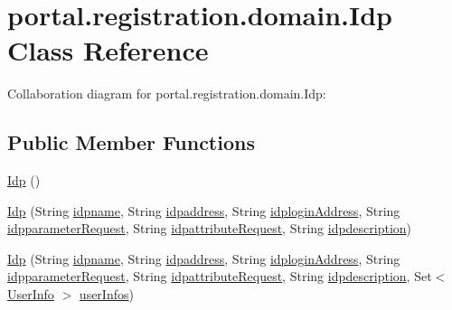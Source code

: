 \hypertarget{classportal_1_1registration_1_1domain_1_1Idp}{
\section{portal.registration.domain.Idp Class Reference}
\label{classportal_1_1registration_1_1domain_1_1Idp}
}


Collaboration diagram for portal.registration.domain.Idp:
\subsection*{Public Member Functions}
\begin{DoxyCompactItemize}
\item 
\hyperlink{classportal_1_1registration_1_1domain_1_1Idp_a89d6a58205cda942a28e7bce398c9c56}{Idp} ()
\item 
\hyperlink{classportal_1_1registration_1_1domain_1_1Idp_a91f22e723061415783b3cfd9079cdfa6}{Idp} (String \hyperlink{classportal_1_1registration_1_1domain_1_1Idp_a26fab2dd3a812749a8cef7b376d529f7}{idpname}, String \hyperlink{classportal_1_1registration_1_1domain_1_1Idp_a3eaa57b7e2ce7351be26c8eab9dba8e9}{idpaddress}, String \hyperlink{classportal_1_1registration_1_1domain_1_1Idp_a4690c173d3e4110cd5501e5c7818ae23}{idploginAddress}, String \hyperlink{classportal_1_1registration_1_1domain_1_1Idp_acd9b443db5b19445703d63d4f340cf9a}{idpparameterRequest}, String \hyperlink{classportal_1_1registration_1_1domain_1_1Idp_abf267afc4e5c91da690804e5abbef7df}{idpattributeRequest}, String \hyperlink{classportal_1_1registration_1_1domain_1_1Idp_a55fbc92095f6fd9d1fb4c5bd42b18baa}{idpdescription})
\item 
\hyperlink{classportal_1_1registration_1_1domain_1_1Idp_a468b787e0d2a25b2d3644e41059c10ed}{Idp} (String \hyperlink{classportal_1_1registration_1_1domain_1_1Idp_a26fab2dd3a812749a8cef7b376d529f7}{idpname}, String \hyperlink{classportal_1_1registration_1_1domain_1_1Idp_a3eaa57b7e2ce7351be26c8eab9dba8e9}{idpaddress}, String \hyperlink{classportal_1_1registration_1_1domain_1_1Idp_a4690c173d3e4110cd5501e5c7818ae23}{idploginAddress}, String \hyperlink{classportal_1_1registration_1_1domain_1_1Idp_acd9b443db5b19445703d63d4f340cf9a}{idpparameterRequest}, String \hyperlink{classportal_1_1registration_1_1domain_1_1Idp_abf267afc4e5c91da690804e5abbef7df}{idpattributeRequest}, String \hyperlink{classportal_1_1registration_1_1domain_1_1Idp_a55fbc92095f6fd9d1fb4c5bd42b18baa}{idpdescription}, Set$<$ \hyperlink{classportal_1_1registration_1_1domain_1_1UserInfo}{UserInfo} $>$ \hyperlink{classportal_1_1registration_1_1domain_1_1Idp_a888963b67e250b7810486a9566d90e62}{userInfos})

\end{DoxyCompactItemize}
